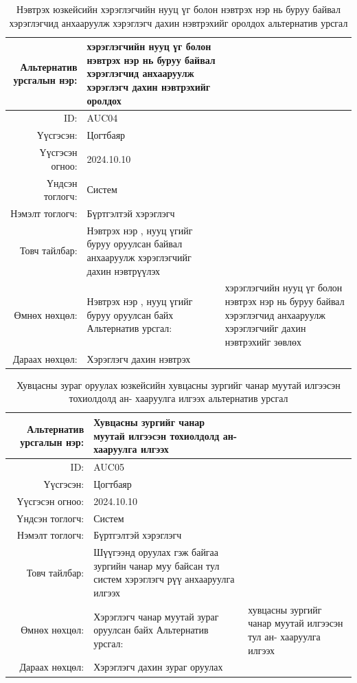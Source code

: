 \newpage
\begin{longtable}{|r|p{11.5cm}|}
    \caption{Нэвтрэх юзкейсийн хэрэглэгчийн нууц үг болон нэвтрэх нэр нь буруу
байвал хэрэглэгчид анхааруулж хэрэглэгч дахин нэвтрэхийг
оролдох альтернатив урсгал} 
	\label{table:alt}\\ \hline
	
	{Альтернатив урсгалын нэр:} & {хэрэглэгчийн нууц үг болон нэвтрэх нэр нь буруу
байвал хэрэглэгчид анхааруулж хэрэглэгч дахин нэвтрэхийг
оролдох}\\ \hline
	{ID:} & {AUC04}\\ \hline
	{Үүсгэсэн:} & {Цогтбаяр}\\ \hline
	{Үүсгэсэн огноо:} & {2024.10.10}\\ \hline
	{Үндсэн тоглогч:} & {Систем}\\ \hline
	{Нэмэлт тоглогч:} & {Бүртгэлтэй хэрэглэгч}\\ \hline
	{Товч тайлбар:} & {Нэвтрэх нэр , нууц үгийг буруу оруулсан байвал анхааруулж хэрэглэгчийг дахин нэвтрүүлэх }\\ \hline
	{Өмнөх нөхцөл:} & {Нэвтрэх нэр , нууц үгийг буруу оруулсан байх} \hline
	{Альтернатив урсгал:} & {хэрэглэгчийн нууц үг болон нэвтрэх нэр нь буруу
байвал хэрэглэгчид анхааруулж хэрэглэгчийг дахин нэвтрэхийг
зөвлөх}\\ \hline
	{Дараах нөхцөл:} & {Хэрэглэгч дахин нэвтрэх}\\ \hline
\end{longtable}
\newpage
\begin{longtable}{|r|p{11.5cm}|}
    \caption{Хувцасны зураг оруулах юзкейсийн хувцасны зургийг чанар муутай илгээсэн тохиолдолд ан-
хааруулга илгээх альтернатив урсгал} 
	\label{table:alt}\\ \hline
	
	{Альтернатив урсгалын нэр:} & {Хувцасны зургийг чанар муутай илгээсэн тохиолдолд ан-
хааруулга илгээх}\\ \hline
	{ID:} & {AUC05}\\ \hline
	{Үүсгэсэн:} & {Цогтбаяр}\\ \hline
	{Үүсгэсэн огноо:} & {2024.10.10}\\ \hline
	{Үндсэн тоглогч:} & {Систем}\\ \hline
	{Нэмэлт тоглогч:} & {Бүртгэлтэй хэрэглэгч}\\ \hline
	{Товч тайлбар:} & {Шүүгээнд оруулах гэж байгаа зургийн чанар муу байсан тул систем хэрэглэгч рүү анхааруулга илгээх}\\ \hline
	{Өмнөх нөхцөл:} & {Хэрэглэгч чанар муутай зураг оруулсан байх} \hline
	{Альтернатив урсгал:} & {хувцасны зургийг чанар муутай илгээсэн тул ан-
хааруулга илгээх}\\ \hline
	{Дараах нөхцөл:} & {Хэрэглэгч дахин зураг оруулах}\\ \hline
\end{longtable}
